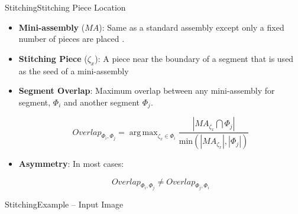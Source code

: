 \documentclass[10pt]{beamer}
\DeclareMathOperator*{\argmax}{arg\,max} %
\begin{document}
\begin{frame}{Stitching}{Stitching Piece Location}
  \begin{itemize}
    \item \textbf{Mini-assembly} (\hspace{-0.1em}\textbf{$MA$}): Same as a standard assembly except only a fixed number of pieces are placed .
    \vfill    
    \item \textbf{Stitching Piece} (\textbf{$\zeta_x$}): A piece near the boundary of a segment that is used as the seed of a mini-assembly
    \vfill
    \item \textbf{Segment Overlap}: Maximum overlap between any mini-assembly for segment, $\Phi_i$ and another segment $\Phi_j$.
    \vfill
		\begin{center}  
		  \vspace{-2em}
			\begin{equation} \label{eq:segmentOverlap}
			  Overlap_{\Phi_i,\Phi_j} = \argmax_{\zeta_x \in \Phi_i} {\frac{|MA_{\zeta_x} \bigcap \Phi_j|}{\text{min}(|MA_{\zeta_x}|, |\Phi_j|)}}
			\end{equation}
			\vspace{-2em}
		\end{center}      
    \vfill
    \item \textbf{Asymmetry}: In most cases:
	  \begin{center}
	    \vspace{-2em}
	    \begin{equation}
	      Overlap_{\Phi_i,\Phi_j} \neq Overlap_{\Phi_j,\Phi_i}
	    \end{equation}
	  \end{center}  
	  \vspace{-1em}
  \end{itemize}
\end{frame}




\begin{frame}{Stitching}{Example -- Input Image}
  \begin{center}
    \vfill    
  \end{center}
\end{frame}
\end{document}
